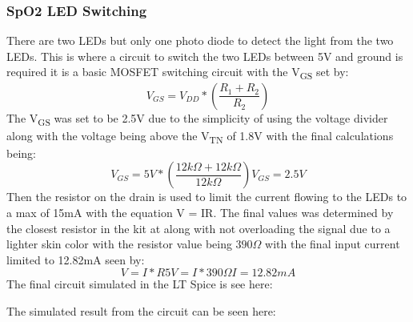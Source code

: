 \documentclass{article}
\begin{document}
\subsubsection{SpO2 LED Switching}
There are two LEDs but only one photo diode to detect the light from the two LEDs. This is where a circuit to switch the two LEDs between 5V and ground is required it is a basic MOSFET switching circuit with the V\textsubscript{GS} set by: 
\begin{equation}
V_{GS} = V_{DD}* (\frac{R_{1}+R_{2}}{R_{2}})
\end{equation}
The V\textsubscript{GS} was set to be 2.5V due to the simplicity of using the voltage divider along with the voltage being above the V\textsubscript{TN} of 1.8V with the final calculations being:
\begin{equation}
V_{GS} = 5V* (\frac{12k\Omega+12k\Omega}{12k\Omega})
V_{GS} = 2.5V
\end{equation}
Then the resistor on the drain is used to limit the current flowing to the LEDs to a max of 15mA with the equation V = IR. The final values was determined by the closest resistor in the kit at along with not overloading the signal due to a lighter skin color with the resistor value being $390\Omega$ with the final input current limited to 12.82mA seen by:
\begin{equation}
V = I*R
5V = I * 390\Omega
I = 12.82mA
\end{equation}
The final circuit simulated in the LT Spice is see here:
\begin{center}
\end{center}
The simulated result from the circuit can be seen here: 
\begin{center}
\end{center}
\end{document}
